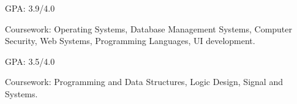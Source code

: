
\USC
{}
\vspace{1.3ex} %

\UM
{}
\begin{miniItemize}
    \item GPA: 3.9/4.0
    \item Coursework: 
        Operating Systems,
        Database Management Systems,
        Computer Security,
        Web Systems,
        Programming Languages,
        UI development.
\end{miniItemize}

\SJTU
{}
\begin{miniItemize}
    \item GPA: 3.5/4.0
    \item Coursework:
        Programming and Data Structures,
        Logic Design,
        Signal and Systems.
\end{miniItemize}
